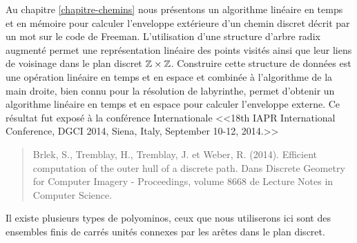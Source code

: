 \begin{introduction}
Au chapitre \ref{chapitre-chemins} nous présentons un algorithme linéaire en temps et en mémoire pour calculer l'enveloppe extérieure d'un chemin discret décrit par un mot sur le code de Freeman. L'utilisation d'une structure d'arbre radix augmenté \cite{BKP} permet une représentation linéaire des points visités ainsi que leur liens de voisinage dans le plan discret $\mathbb{Z} \times \mathbb{Z}$. Construire cette structure de données est une opération linéaire en temps et en espace et combinée à l'algorithme de la main droite, bien connu pour la résolution de labyrinthe, permet d'obtenir un algorithme linéaire en temps et en espace pour calculer l'enveloppe externe. Ce résultat fut exposé à la conférence Internationale <<18th IAPR International Conference, DGCI 2014, Siena, Italy, September 10-12, 2014.>>
\begin{quote} Brlek, S., Tremblay, H., Tremblay, J. et Weber, R. (2014). Efficient computation of the outer hull of a discrete path. Dans Discrete Geometry for Computer Imagery -
 Proceedings, volume 8668 de Lecture Notes in Computer Science. 
\end{quote}



 


\vspace{-0.5em}
Il existe plusieurs types de polyominos, ceux que nous utiliserons ici sont des ensembles finis de carrés unités connexes par les arêtes dans le plan discret.


\end{introduction}
